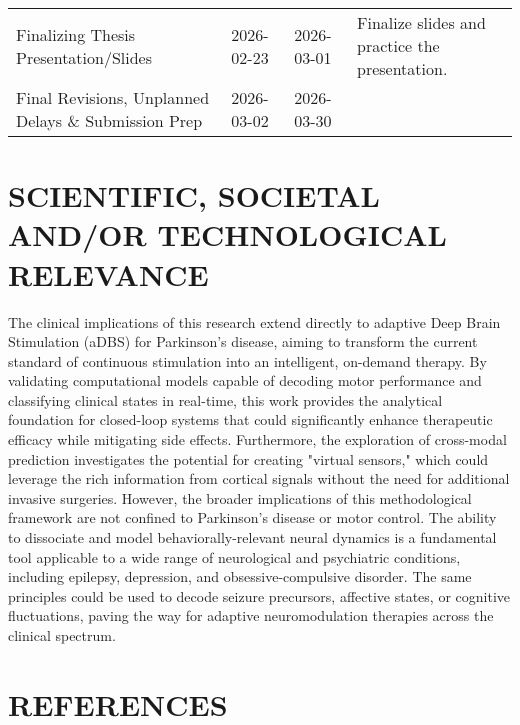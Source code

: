 \documentclass[12pt, a4paper]{article}
\begin{document}
\begin{table}[h!]
{\begin{tabularx}{\textwidth}{>{\RaggedRight}X l l >{\RaggedRight}X}
            Finalizing Thesis Presentation/Slides                         & 2026-02-23          & 2026-03-01          & Finalize slides and practice the presentation.                                                                              \\

            Final Revisions, Unplanned Delays \& Submission Prep & 2026-03-02 & 2026-03-30 &                                                                                                                             \\
        \end{tabularx}
    }
\end{table}

\newpage

\section{SCIENTIFIC, SOCIETAL AND/OR TECHNOLOGICAL RELEVANCE}
The clinical implications of this research extend directly to adaptive Deep Brain Stimulation (aDBS) for Parkinson's disease, aiming to transform the current standard of continuous stimulation into an intelligent, on-demand therapy. By validating computational models capable of decoding motor performance and classifying clinical states in real-time, this work provides the analytical foundation for closed-loop systems that could significantly enhance therapeutic efficacy while mitigating side effects. Furthermore, the exploration of cross-modal prediction investigates the potential for creating "virtual sensors," which could leverage the rich information from cortical signals without the need for additional invasive surgeries. However, the broader implications of this methodological framework are not confined to Parkinson's disease or motor control. The ability to dissociate and model behaviorally-relevant neural dynamics is a fundamental tool applicable to a wide range of neurological and psychiatric conditions, including epilepsy, depression, and obsessive-compulsive disorder. The same principles could be used to decode seizure precursors, affective states, or cognitive fluctuations, paving the way for adaptive neuromodulation therapies across the clinical spectrum.

\section{REFERENCES}
\printbibliography[heading=none]
\end{document}
